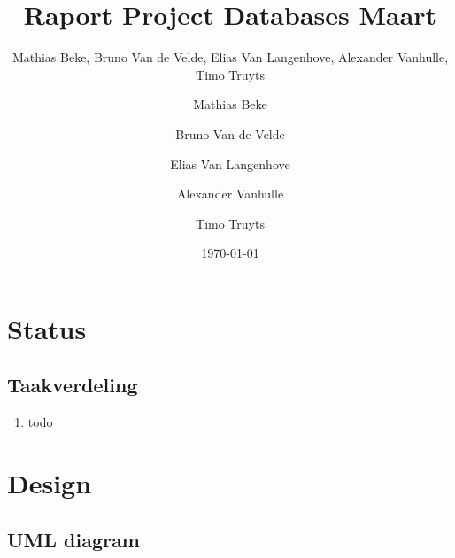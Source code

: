 \documentclass[11pt]{article}
\title{Raport Project Databases Maart}
\author{Mathias Beke, Bruno Van de Velde, Elias Van Langenhove, Alexander Vanhulle, Timo Truyts}
\author{
  Mathias Beke
  \and
  Bruno Van de Velde
  \and
  Elias Van Langenhove
  \and
  Alexander Vanhulle
  \and
  Timo Truyts
}
\date{\today}
\begin{document}
\rhead{}



\maketitle


\tableofcontents





\section{Status}




\subsection{Taakverdeling}


\begin{enumerate}
    
   \item todo    
    
\end{enumerate}




\section{Design}


\subsection{UML diagram}
\end{document}
